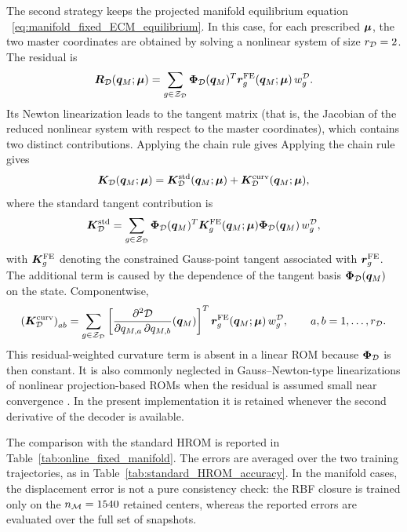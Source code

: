 \documentclass[11pt,a4paper]{article}
\begin{document}
The second strategy keeps the projected manifold equilibrium equation
 ~\eqref{eq:manifold_fixed_ECM_equilibrium}. In this case, for each prescribed
$\bm{\mu}$, the two master coordinates are obtained by solving a nonlinear
system of size $r_{\mathcal{D}}=2$. The residual is
\[
    \bm{R}_{\mathcal{D}}(\bm{q}_M;\bm{\mu})
    =
    \sum_{g\in\mathcal{Z}_{\mathcal{D}}}
    \bm{\Phi}_{\mathcal{D}}(\bm{q}_M)^T
    \bm{r}^{\mathrm{FE}}_{g}(\bm{q}_M;\bm{\mu})
    \,w^{\mathcal{D}}_{g}.
\]
Its Newton linearization leads to the tangent matrix (that is, the Jacobian of
the reduced nonlinear system with respect to the master coordinates), which
contains two distinct contributions. Applying the chain rule gives Applying the chain rule
gives
\begin{equation}
\label{eq:manifold_tangent_split}
    \bm{K}_{\mathcal{D}}(\bm{q}_M;\bm{\mu})
    =
    \bm{K}_{\mathcal{D}}^{\mathrm{std}}(\bm{q}_M;\bm{\mu})
    +
    \bm{K}_{\mathcal{D}}^{\mathrm{curv}}(\bm{q}_M;\bm{\mu}),
\end{equation}
where the standard tangent contribution is
\begin{equation}
\label{eq:manifold_standard_tangent}
    \bm{K}_{\mathcal{D}}^{\mathrm{std}}
    =
    \sum_{g\in\mathcal{Z}_{\mathcal{D}}}
    \bm{\Phi}_{\mathcal{D}}(\bm{q}_M)^T
    \bm{K}^{\mathrm{FE}}_g(\bm{q}_M;\bm{\mu})
    \bm{\Phi}_{\mathcal{D}}(\bm{q}_M)
    \,w^{\mathcal{D}}_{g},
\end{equation}
with $\bm{K}^{\mathrm{FE}}_g$ denoting the constrained Gauss-point tangent associated with
$\bm{r}^{\mathrm{FE}}_{g}$. The additional term is caused by the dependence of the tangent basis
$\bm{\Phi}_{\mathcal{D}}(\bm{q}_M)$ on the state. Componentwise,
\begin{equation}
\label{eq:manifold_curvature_tangent}
    \left(\bm{K}_{\mathcal{D}}^{\mathrm{curv}}\right)_{ab}
    =
    \sum_{g\in\mathcal{Z}_{\mathcal{D}}}
    \left[
    \dfrac{\partial ^2\mathcal{\boldsymbol{D}}}{\partial q_{M,a}\,\partial q_{M,b}}(\bm{q}_M)
    \right]^T
    \bm{r}^{\mathrm{FE}}_{g}(\bm{q}_M;\bm{\mu})
    \,w^{\mathcal{D}}_{g},
    \qquad
    a,b=1,\ldots,r_{\mathcal{D}} .
\end{equation}
This residual-weighted curvature term is absent in a linear ROM because
$\bm{\Phi}_{\mathcal{D}}$ is then constant. It is also commonly neglected in Gauss--Newton-type
linearizations of nonlinear projection-based ROMs when the residual is assumed
small near convergence \cite{barnett2022quadratic,ares2026nonlinear}. In the
present implementation it is retained whenever the second derivative of the
decoder is available.

The comparison with the standard HROM is reported in
Table~\ref{tab:online_fixed_manifold}. The errors are averaged over the two
training trajectories, as in Table~\ref{tab:standard_HROM_accuracy}. In the
manifold cases, the displacement error is not a pure consistency check: the RBF
closure is trained only on the $n_{\mathcal{M}}=1540$ retained centers, whereas the
reported errors are evaluated over the full set of snapshots.
\end{document}
